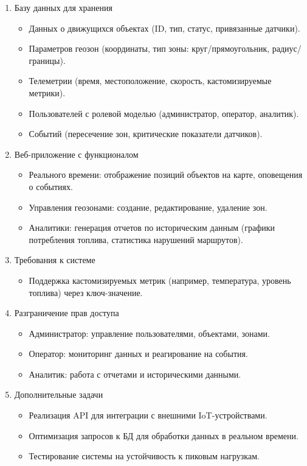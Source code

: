 \begin{enumerate}
\item Базу данных для хранения
\begin{itemize}
\item Данных о движущихся объектах (ID, тип, статус, привязанные датчики).
\item Параметров геозон (координаты, тип зоны: круг/прямоугольник, радиус/границы).
\item Телеметрии (время, местоположение, скорость, кастомизируемые метрики).
\item Пользователей с ролевой моделью (администратор, оператор, аналитик).
\item Событий (пересечение зон, критические показатели датчиков).
\end{itemize}
\item Веб-приложение с функционалом
\begin{itemize}
\item Реального времени: отображение позиций объектов на карте, оповещения о событиях.
\item Управления геозонами: создание, редактирование, удаление зон.
\item Аналитики: генерация отчетов по историческим данным (графики потребления топлива, статистика нарушений маршрутов).
\end{itemize}
\item Требования к системе
\begin{itemize}
\item Поддержка кастомизируемых метрик (например, температура, уровень топлива) через ключ-значение.
\end{itemize}
\item Разграничение прав доступа
\begin{itemize}
\item Администратор: управление пользователями, объектами, зонами.
\item Оператор: мониторинг данных и реагирование на события.
\item Аналитик: работа с отчетами и историческими данными.
\end{itemize}
\item Дополнительные задачи
\begin{itemize}
\item Реализация API для интеграции с внешними IoT-устройствами.
\item Оптимизация запросов к БД для обработки данных в реальном времени.
\item Тестирование системы на устойчивость к пиковым нагрузкам.
\end{itemize}
\end{enumerate}

